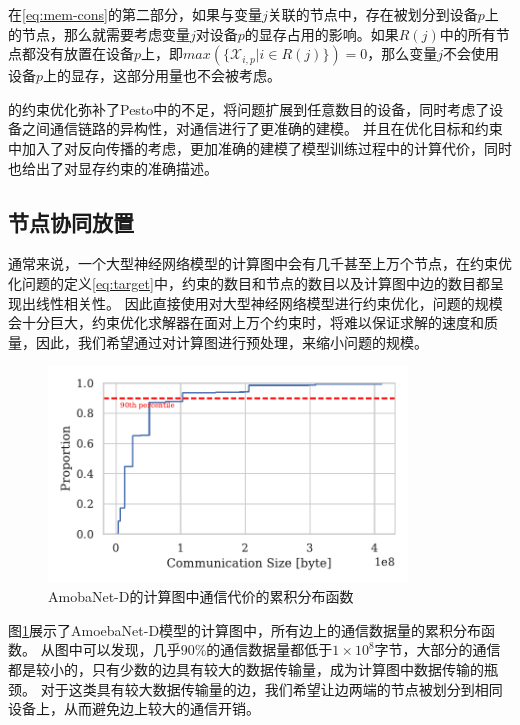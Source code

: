 在\ref{eq:mem-cons}的第二部分，如果与变量$j$关联的节点中，存在被划分到设备$p$上的节点，那么就需要考虑变量$j$对设备$p$的显存占用的影响。如果$R(j)$中的所有节点都没有放置在设备$p$上，即$\mathit{max}(\{\mathcal{X}_{i,p} |  i\in R(j)\})=0$，那么变量$j$不会使用设备$p$上的显存，这部分用量也不会被考虑。

\sys{}的约束优化弥补了Pesto中的不足，将问题扩展到任意数目的设备，同时考虑了设备之间通信链路的异构性，对通信进行了更准确的建模。
并且\sys{}在优化目标和约束中加入了对反向传播的考虑，更加准确的建模了模型训练过程中的计算代价，同时也给出了对显存约束的准确描述。

\subsection{节点协同放置}
\label{sec:co-place}
通常来说，一个大型神经网络模型的计算图中会有几千甚至上万个节点，在约束优化问题的定义\ref{eq:target}中，约束的数目和节点的数目以及计算图中边的数目都呈现出线性相关性。
因此直接使用对大型神经网络模型进行约束优化，问题的规模会十分巨大，约束优化求解器在面对上万个约束时，将难以保证求解的速度和质量，因此，我们希望通过对计算图进行预处理，来缩小问题的规模。


\begin{figure}[h]
	\centering
	\includegraphics[width=0.85\textwidth]{./figure/4-alg/commmu_cdf.pdf}
	\caption{AmobaNet-D的计算图中通信代价的累积分布函数}
	\label{fig:commu-cdf}
\end{figure}

图\ref{fig:commu-cdf}展示了AmoebaNet-D模型的计算图中，所有边上的通信数据量的累积分布函数。
从图中可以发现，几乎$90\%$的通信数据量都低于$1\times 10^8$字节，大部分的通信都是较小的，只有少数的边具有较大的数据传输量，成为计算图中数据传输的瓶颈。
对于这类具有较大数据传输量的边，我们希望让边两端的节点被划分到相同设备上，从而避免边上较大的通信开销。

